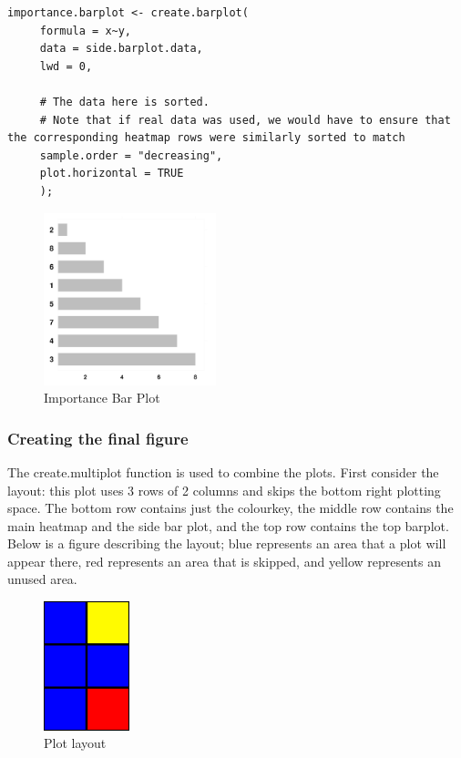 \documentclass[letterpaper]{article}
\begin{document}
\begin{verbatim}
importance.barplot <- create.barplot(
     formula = x~y,
     data = side.barplot.data,
     lwd = 0,
     
     # The data here is sorted. 
     # Note that if real data was used, we would have to ensure that the corresponding heatmap rows were similarly sorted to match
     sample.order = "decreasing",
     plot.horizontal = TRUE
     );
\end{verbatim}

\begin{figure}[!ht]
  \begin{center}
     \includegraphics[width=50mm]{Figures/ex2_importance_barplot.png}
     \caption{Importance Bar Plot}
     \label{fig:picture}
  \end{center}
\end{figure}

\subsubsection{Creating the final figure}

The create.multiplot function is used to combine the plots. First consider the layout: this plot uses 3 rows of 2 columns and skips the bottom right plotting space. The bottom row contains just the colourkey, the middle row contains the main heatmap and the side bar plot, and the top row contains the top barplot. Below is a figure describing the layout; blue represents an area that a plot will appear there, red represents an area that is skipped, and yellow represents an unused area.

\begin{figure}[!ht]
  \begin{center}
     \includegraphics[width=25mm]{Figures/ex2_schematic.pdf}
     \caption{Plot layout}
     \label{fig:picture}
  \end{center}
\end{figure}
\end{document}
